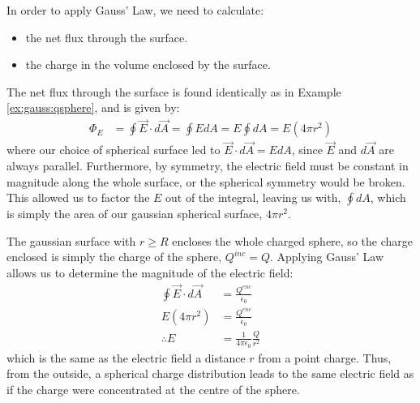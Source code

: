 \begin{example}
In order to apply Gauss' Law, we need to calculate:
\begin{itemize}
\item the net flux through the surface.
\item the charge in the volume enclosed by the surface. 
\end{itemize}
The net flux through the surface is found identically as in Example \ref{ex:gauss:qsphere}, and is given by:
\begin{align*}
\Phi_E&=\oint \vec E\cdot d\vec A=\oint E dA= E\oint dA=E(4\pi r^2)
\end{align*}
where our choice of spherical surface led to $\vec E\cdot d\vec A=EdA$, since $\vec E$ and $d\vec A$ are always parallel. Furthermore, by symmetry, the electric field must be constant in magnitude along the whole surface, or the spherical symmetry would be broken. This allowed us to factor the $E$ out of the integral, leaving us with, $\oint dA$, which is simply the area of our gaussian spherical surface, $4\pi r^2$.

The gaussian surface with $r\geq R$ encloses the whole charged sphere, so the charge enclosed is simply the charge of the sphere, $Q^{inc}=Q$. Applying Gauss' Law allows us to determine the magnitude of the electric field:
\begin{align*}
\oint \vec E\cdot d\vec A&=\frac{Q^{enc}}{\epsilon_0} \\
E(4\pi r^2) &= \frac{Q^{enc}}{\epsilon_0}\\
\therefore E&= \frac{1}{4\pi\epsilon_0}\frac{Q}{r^2}
\end{align*}
which is the same as the electric field a distance $r$ from a point charge. Thus, from the outside, a spherical charge distribution leads to the same electric field as if the charge were concentrated at the centre of the sphere.


\end{example}
